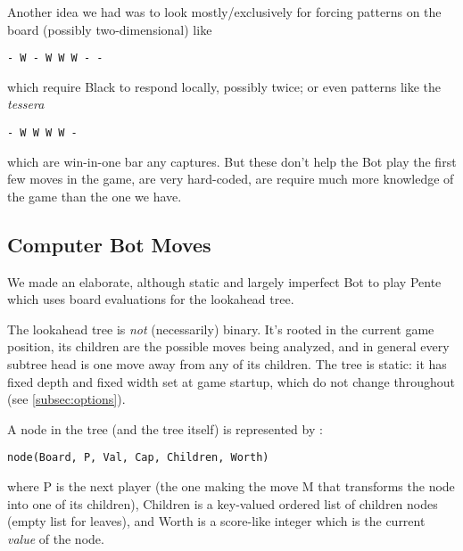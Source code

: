 \documentclass[12pt,a4paper,notitlepage]{article}
\begin{document}
Another idea we had was to look mostly/exclusively for forcing patterns on the board (possibly two-dimensional) like
\begin{center}
\tt - W - W W W - -
\end{center}
which require Black to respond locally, possibly twice; or even patterns like the \textit{tessera}
\begin{center}
\tt - W W W W -
\end{center}
which are win-in-one bar any captures. But these don't help the Bot play the first few moves in the game, are very hard-coded, are require much more knowledge of the game than the one we have.

\subsection{Computer Bot Moves}
\label{subsec:bot}

We made an elaborate, although static and largely imperfect Bot to play Pente which uses board evaluations for the lookahead tree.

The lookahead tree is \textit{not} (necessarily) binary. It's rooted in the current game position, its children are the possible moves being analyzed, and in general every subtree head is one move away from any of its children.
The tree is static: it has fixed depth and fixed width set at game startup, which do not change throughout (see \autoref{subsec:options}).

A node in the tree (and the tree itself) is represented by :
\begin{center}
\tt node(Board, P, Val, Cap, Children, Worth)
\end{center}
where P is the next player (the one making the move M that transforms the node into one of its children), Children is a key-valued ordered list of children nodes (empty list for leaves), and Worth is a score-like integer which is the current \textit{value} of the node.
\end{document}

